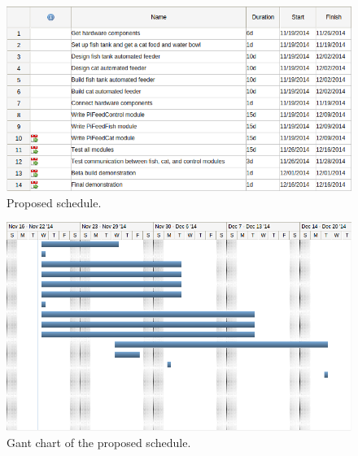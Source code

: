 \begin{figure}[H]
    \centering
    \captionsetup{justification=centering, margin = 0.5cm}
    \includegraphics[scale=0.3]{images/Schedule} 
    \caption{Proposed schedule.}
    \label{fig:sched}
\end{figure}

\begin{figure}[H]
    \centering
    \captionsetup{justification=centering, margin = 0.5cm}
    \includegraphics[scale=0.3]{images/Gantt} 
    \caption{Gant chart of the proposed schedule.}
    \label{fig:gantt}
\end{figure}



